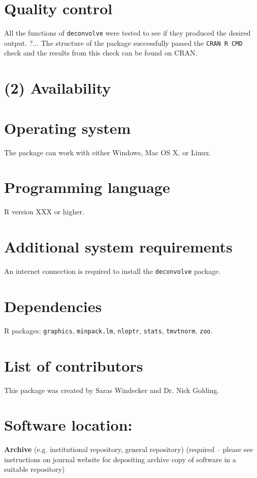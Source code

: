 \documentclass{jors}\usepackage[]{graphicx}\usepackage[]{color}
\begin{document}
\section*{Quality control}
All the functions of \verb|deconvolve| were tested to see if they produced the desired output. ?... The structure of the package successfully passed the \verb|CRAN R CMD| check and the results from this check can be found on CRAN.

\section*{(2) Availability}
\vspace{0.5cm}
\section*{Operating system}
The package can work with either Windows, Mac OS X, or Linux.

\section*{Programming language}
R version XXX or higher.

\section*{Additional system requirements}
An internet connection is required to install the \verb|deconvolve| package.

\section*{Dependencies}
R packages: \verb|graphics|, \verb|minpack.lm|, \verb|nloptr|, \verb|stats|, \verb|tmvtnorm|, \verb|zoo|.

\section*{List of contributors}
This package was created by Saras Windecker and Dr. Nick Golding.

\section*{Software location:}

{\bf Archive} (e.g. institutional repository, general repository) (required – please see instructions on journal website for depositing archive copy of software in a suitable repository)
\end{document}
